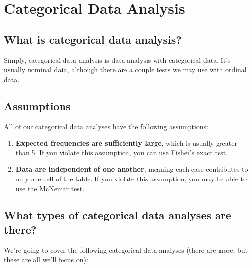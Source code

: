\documentclass[
]{book}
\begin{document}
\hypertarget{categorical-data-analysis}{%
\chapter{Categorical Data Analysis}\label{categorical-data-analysis}}

\hypertarget{what-is-categorical-data-analysis}{%
\section{What is categorical data analysis?}\label{what-is-categorical-data-analysis}}

Simply, categorical data analysis is data analysis with categorical data. It's usually nominal data, although there are a couple tests we may use with ordinal data.

\hypertarget{assumptions-4}{%
\section{Assumptions}\label{assumptions-4}}

All of our categorical data analyses have the following assumptions:

\begin{enumerate}
\def\labelenumi{\arabic{enumi}.}
\item
  \textbf{Expected frequencies are sufficiently large}, which is usually greater than 5. If you violate this assumption, you can use Fisher's exact test.
\item
  \textbf{Data are independent of one another}, meaning each case contributes to only one cell of the table. If you violate this assumption, you may be able to use the McNemar test.
\end{enumerate}

\hypertarget{what-types-of-categorical-data-analyses-are-there}{%
\section{What types of categorical data analyses are there?}\label{what-types-of-categorical-data-analyses-are-there}}

We're going to cover the following categorical data analyses (there are more, but these are all we'll focus on):
\end{document}
